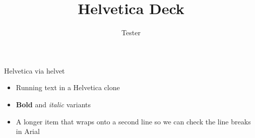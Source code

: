 \documentclass{beamer}
\title{Helvetica Deck}
\author{Tester}
\date{}
\begin{document}
\begin{frame}{Helvetica via helvet}
  \begin{itemize}
    \item Running text in a Helvetica clone
    \item \textbf{Bold} and \textit{italic} variants
    \item A longer item that wraps onto a second line so we can check the line breaks in Arial
  \end{itemize}
\end{frame}
\end{document}
